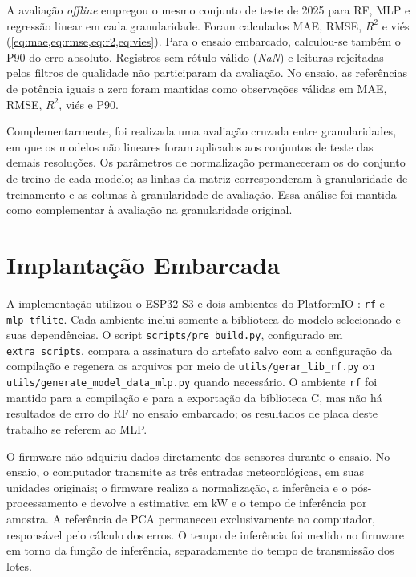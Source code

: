 A avaliação \textit{offline} empregou o mesmo conjunto de teste de 2025 para
RF, MLP e regressão linear em cada granularidade. Foram calculados MAE,
RMSE, $R^2$ e viés (\cref{eq:mae,eq:rmse,eq:r2,eq:vies}). Para o ensaio
embarcado, calculou-se também o P90 do erro absoluto. Registros sem rótulo válido
(\textit{NaN}) e leituras rejeitadas pelos filtros de qualidade não
participaram da avaliação. No ensaio, as referências de potência iguais a
zero foram mantidas como observações válidas em MAE, RMSE, $R^2$, viés e
P90.

Complementarmente, foi realizada uma avaliação cruzada entre granularidades,
em que os modelos não lineares foram aplicados aos conjuntos de teste das
demais resoluções. Os parâmetros de normalização permaneceram os do conjunto
de treino de cada modelo; as linhas da matriz corresponderam à granularidade
de treinamento e as colunas à granularidade de avaliação. Essa análise foi
mantida como complementar à avaliação na granularidade original.

\section{Implantação Embarcada}

A implementação utilizou o ESP32-S3 \cite{espressif2024} e dois ambientes do
PlatformIO \cite{platformio2024}: \texttt{rf} e \texttt{mlp-tflite}. Cada
ambiente inclui somente a biblioteca do modelo selecionado e suas
dependências. O script \texttt{scripts/pre\_build.py}, configurado em
\texttt{extra\_scripts}, compara a assinatura do artefato salvo com a
configuração da compilação e regenera os arquivos por meio de
\texttt{utils/gerar\_lib\_rf.py} ou \texttt{utils/generate\_model\_data\_mlp.py} quando
necessário. O ambiente \texttt{rf} foi mantido para a compilação e para a
exportação da biblioteca C, mas não há resultados de erro do RF no ensaio
embarcado; os resultados de placa deste trabalho se referem ao MLP.

O firmware não adquiriu dados diretamente dos sensores durante o ensaio. No
ensaio, o computador transmite as três entradas meteorológicas, em suas
unidades originais; o firmware realiza a normalização, a inferência e o
pós-processamento e devolve a estimativa em kW e o tempo de inferência por
amostra. A referência de PCA permaneceu exclusivamente no computador,
responsável pelo cálculo dos erros. O tempo de inferência foi medido no
firmware em torno da função de inferência, separadamente do tempo de
transmissão dos lotes.

